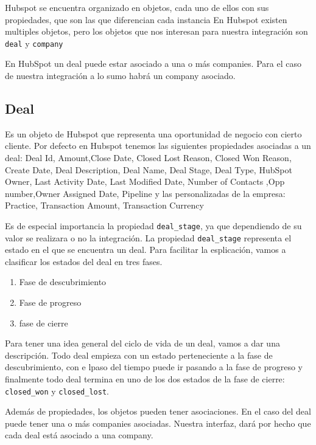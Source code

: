 Hubspot se encuentra organizado en objetos, cada uno de ellos con sus propiedades, que son las que diferencian cada instancia
En Hubspot existen multiples objetos, pero los objetos que nos interesan para nuestra integración son \verb|deal| y \verb|company|



En HubSpot un deal puede estar asociado a una o más companies. Para el caso de nuestra integración a lo sumo habrá un company asociado.

\subsection{Deal}
	Es un objeto de Hubspot que representa una oportunidad de negocio con cierto cliente. Por defecto en Hubspot tenemos las siguientes propiedades asociadas a un deal:			
		Deal Id, Amount,Close Date, Closed Lost Reason, Closed Won Reason, Create Date, Deal Description, Deal Name, Deal Stage, Deal Type, HubSpot Owner, Last Activity Date, Last Modified Date, Number of Contacts
		,Opp number,Owner Assigned Date, Pipeline y las personalizadas de la empresa: Practice, Transaction Amount, Transaction Currency
		
		Es de especial importancia la propiedad \verb|deal_stage|, ya que dependiendo de su valor se realizara o no la integración.
		La propiedad \verb|deal_stage| representa el estado en el que se encuentra un deal. Para facilitar la esplicación, vamos a clasificar los estados del deal en tres fases.
		\begin{enumerate}
			\item Fase de descubrimiento
			\item Fase de progreso 
			\item fase de cierre
		\end{enumerate}
		Para tener una idea general del ciclo de vida de un deal, vamos a dar una descripción. Todo deal empieza con un estado perteneciente a la fase de descubrimiento, con e lpaso del tiempo puede ir pasando a la fase de progreso y finalmente todo deal termina en uno de los dos estados de la fase de cierre: \verb|closed_won| y \verb|closed_lost|.
		
		
			
			
			
		Además de propiedades, los objetos pueden tener asociaciones. En el caso del deal puede tener una o más companies asociadas. Nuestra interfaz, dará por hecho que cada deal está asociado a una company.
			
